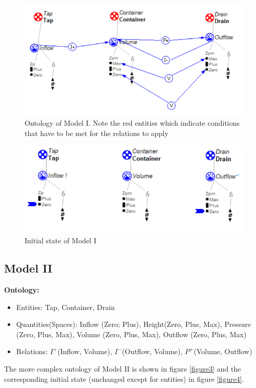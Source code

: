 \documentclass{article}
\begin{document}
\begin{figure}
	\includegraphics{Simple_Flow.png}
	\caption{Ontology of Model I. Note the red entities which indicate conditions that have to be met for the relations to apply}
	\label{fig: figure1}
\end{figure}

\begin{figure}
	\includegraphics{Scenario_1.png}
	\caption{Initial state of Model I}
	\label{figure2}
\end{figure}

\subsection {Model II}

\textbf{Ontology:}
\begin{itemize}
	\item Entities: Tap, Container, Drain
	\item Quantities(Spaces): Inflow (Zero; Plus), Height(Zero, Plus, Max), Pressure (Zero, Plus, Max), Volume (Zero, Plus, Max), Outflow (Zero, Plus, Max)
	\item Relations: $I^+$(Inflow, Volume), $I^-$(Outflow, Volume), $P^+$(Volume, Outflow)
\end{itemize}

The more complex ontology of Model II is shown in figure \ref{figure3} and the corresponding initial state (unchanged except for entities) in figure \ref{figure4}.
\end{document}
